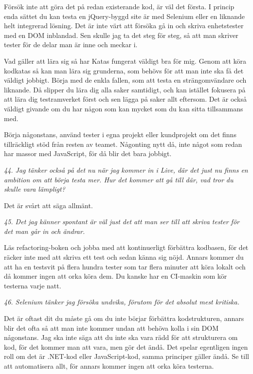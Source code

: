\documentclass[11pt]{article}
\begin{document}
Försök inte att göra det på redan existerande kod, är väl det första. I princip enda sättet du kan testa en jQuery-byggd site är med Selenium eller en liknande helt integrerad lösning. Det är inte värt att försöka gå in och skriva enhetstester med en DOM inblandad. Sen skulle jag ta det steg för steg, så att man skriver tester för de delar man är inne och meckar i.

Vad gäller att lära sig så har Katas fungerat väldigt bra för mig. Genom att köra kodkatas så kan man lära sig grunderna, som behövs för att man inte ska få det väldigt jobbigt. Börja med de enkla fallen, som att testa en strängomvändare och liknande. Då slipper du lära dig alla saker samtidigt, och kan istället fokusera på att lära dig testramverket först och sen lägga på saker allt eftersom. Det är också väldigt givande om du har någon som kan mycket som du kan sitta tillsammans med.

Börja någonstans, använd tester i egna projekt eller kundprojekt om det finns tillräckligt stöd från resten av teamet. Någonting nytt då, inte något som redan har massor med JavaScript, för då blir det bara jobbigt.

\emph{44. Jag tänker också på det nu när jag kommer in i Live, där det just nu finns en ambition om att börja testa mer. Hur det kommer att gå till där, vad tror du skulle vara lämpligt?}

Det är svårt att säga allmänt.

\emph{45. Det jag känner spontant är väl just det att man ser till att skriva tester för det man går in och ändrar.}

Läs refactoring-boken och jobba med att kontinuerligt förbättra kodbasen, för det räcker inte med att skriva ett test och sedan känna sig nöjd. Annars kommer du att ha en testsvit på flera hundra tester som tar flera minuter att köra lokalt och då kommer ingen att orka köra dem. Du kanske har en CI-maskin som kör testerna varje natt.

\emph{46. Selenium tänker jag försöka undvika, förutom för det absolut mest kritiska.}

Det är oftast dit du måste gå om du inte börjar förbättra kodstrukturen, annars blir det ofta så att man inte kommer undan att behöva kolla i sin DOM någonstans. Jag ska inte säga att du inte ska vara rädd för att strukturera om kod, för det kommer man att vara, men gör det ändå. Det spelar egentligen ingen roll om det är .NET-kod eller JavaScript-kod, samma principer gäller ändå. Se till att automatisera allt, för annars kommer ingen att orka köra testerna.
\end{document}
